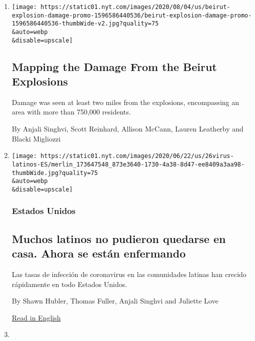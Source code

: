 \begin{enumerate}
\def\labelenumi{\arabic{enumi}.}
\item
  \href{/interactive/2020/08/04/world/middleeast/beirut-explosion-damage.html}{}

  \texttt{[image: https://static01.nyt.com/images/2020/08/04/us/beirut-explosion-damage-promo-1596586440536/beirut-explosion-damage-promo-1596586440536-thumbWide-v2.jpg?quality=75\\\&auto=webp\\\&disable=upscale]}

  \hypertarget{mapping-the-damage-from-the-beirut-explosions}{%
  \subsection{Mapping the Damage From the Beirut
  Explosions}\label{mapping-the-damage-from-the-beirut-explosions}}

  Damage was seen at least two miles from the explosions, encompassing
  an area with more than 750,000 residents.

  By Anjali Singhvi, Scott Reinhard, Allison McCann, Lauren Leatherby
  and Blacki Migliozzi
\item
  \href{/es/2020/06/26/espanol/latinos-coronavirus.html}{}

  \texttt{[image: https://static01.nyt.com/images/2020/06/22/us/26virus-latinos-ES/merlin\_173647548\_873e3640-1730-4a38-8d47-ee8409a3aa98-thumbWide.jpg?quality=75\\\&auto=webp\\\&disable=upscale]}

  \hypertarget{estados-unidos}{%
  \subsubsection{Estados Unidos}\label{estados-unidos}}

  \hypertarget{muchos-latinos-no-pudieron-quedarse-en-casa-ahora-se-estuxe1n-enfermando}{%
  \subsection{Muchos latinos no pudieron quedarse en casa. Ahora se
  están
  enfermando}\label{muchos-latinos-no-pudieron-quedarse-en-casa-ahora-se-estuxe1n-enfermando}}

  Las tasas de infección de coronavirus en las comunidades latinas han
  crecido rápidamente en todo Estados Unidos.

  By Shawn Hubler, Thomas Fuller, Anjali Singhvi and Juliette Love

  \href{https://www.nytimes.com/2020/06/26/us/corona-virus-latinos.html}{Read
  in English}
\item
  \href{/2020/06/26/us/corona-virus-latinos.html}{}


\end{enumerate}
